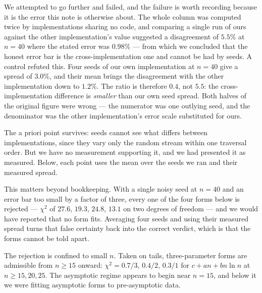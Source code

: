 \documentclass[11pt,a4paper]{article}
\begin{document}
We attempted to go further and failed, and the failure is worth recording because it is the
error this note is otherwise about.  The whole column was computed twice by implementations
sharing no code, and comparing a single run of ours against the other implementation's value
suggested a disagreement of $5.5\%$ at $n=40$ where the stated error was $0.98\%$ --- from which
we concluded that the honest error bar is the cross-implementation one and cannot be had by
seeds.  A control refuted this.  Four seeds of our own implementation at $n=40$ give a spread of
$3.0\%$, and their mean brings the disagreement with the other implementation down to $1.2\%$.
The ratio is therefore $0.4$, not $5.5$: the cross-implementation difference is \emph{smaller}
than our own seed spread.  Both halves of the original figure were wrong --- the numerator was
one outlying seed, and the denominator was the other implementation's error scale substituted
for ours.

The a priori point survives: seeds cannot see what differs between implementations, since they
vary only the random stream within one traversal order.  But we have no measurement supporting
it, and we had presented it as measured.  Below, each point uses the mean over the seeds we ran
and their measured spread.

This matters beyond bookkeeping.  With a single noisy seed at $n=40$ and an error bar too small
by a factor of three, every one of the four forms below is rejected --- $\chi^2$ of $27.6$,
$19.3$, $24.8$, $13.1$ on two degrees of freedom --- and we would have reported that no form
fits.  Averaging four seeds and using their measured spread turns that false certainty back into
the correct verdict, which is that the forms cannot be told apart.

The rejection is confined to small $n$.  Taken on tails, three-parameter forms are admissible
from $n\ge15$ onward: $\chi^2=0.7/3$, $0.4/2$, $0.3/1$ for $c+an+bn\ln n$ at $n\ge15,20,25$.
The asymptotic regime appears to begin near $n=15$, and below it we were fitting asymptotic forms
to pre-asymptotic data.
\end{document}
